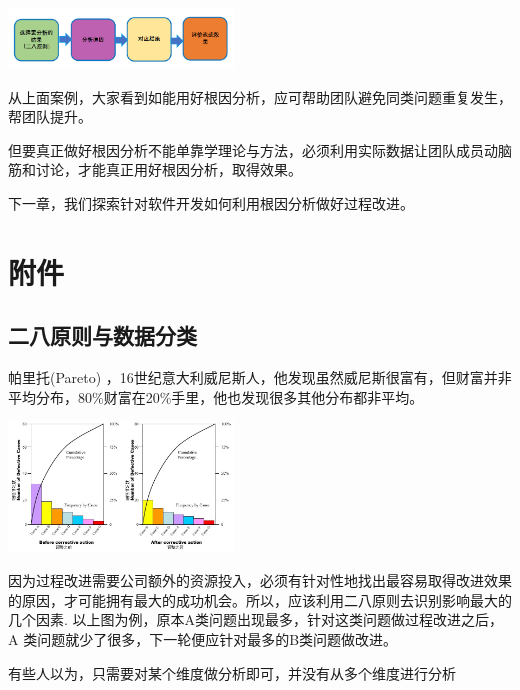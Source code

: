 
\includegraphics[width=6cm]{微信截图_20230707090950.png}

从上面案例，大家看到如能用好根因分析，应可帮助团队避免同类问题重复发生，帮团队提升。

但要真正做好根因分析不能单靠学理论与方法，必须利用实际数据让团队成员动脑筋和讨论，才能真正用好根因分析，取得效果。

下一章，我们探索针对软件开发如何利用根因分析做好过程改进。

\hypertarget{ux9644ux4ef6}{%
\section{附件}\label{ux9644ux4ef6}}

\hypertarget{ux4e8cux516bux539fux5219ux4e0eux6570ux636eux5206ux7c7b}{%
\subsection{二八原则与数据分类}\label{ux4e8cux516bux539fux5219ux4e0eux6570ux636eux5206ux7c7b}}

帕里托(Pareto)
，16世纪意大利威尼斯人，他发现虽然威尼斯很富有，但财富并非平均分布，80\%财富在20\%手里，他也发现很多其他分布都非平均。


\includegraphics[width=6cm]{ToolsParetoScreenshot_2023-06-02_191628.jpg}

因为过程改进需要公司额外的资源投入，必须有针对性地找出最容易取得改进效果的原因，才可能拥有最大的成功机会。所以，应该利用二八原则去识别影响最大的几个因素.
以上图为例，原本A类问题出现最多，针对这类问题做过程改进之后， A
类问题就少了很多，下一轮便应针对最多的B类问题做改进。

有些人以为，只需要对某个维度做分析即可，并没有从多个维度进行分析

